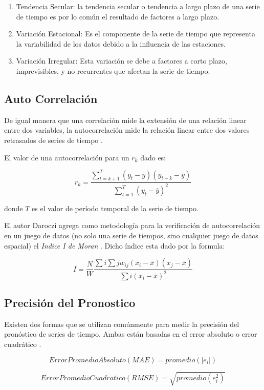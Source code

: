 \begin{enumerate}
	\item Tendencia Secular: la tendencia secular o tendencia a largo plazo de una serie de tiempo es por lo común el resultado de factores a largo plazo. 
	\item Variación Estacional: Es el componente de la serie de tiempo que representa la variabilidad de los datos debido a la influencia de las estaciones.
	\item Variación Irregular: Esta variación se debe a factores a corto plazo, imprevisibles, y no recurrentes que afectan la serie de tiempo. 
\end{enumerate}

\subsection*{Auto Correlación}
De igual manera que una correlación mide la extensión de una relación linear entre dos variables, la autocorrelación mide la relación linear entre dos valores retrasados de series de tiempo \cite{hyndman}.

El valor de una autocorrelación para un \(r_{k}\) dado es:

\[ r_{k} = \frac{\sum_{t = k + 1}^T(y_{t} - \bar{y})(y_{t - k} - \bar{y})}{\sum_{t = 1}^T(y_{t} - \bar{y})^{2}} \]

donde \(T\) es el valor de período temporal de la serie de tiempo. 

El autor Daroczi agrega como metodología para la verificación de autocorrelación en un juego de datos (no solo una serie de tiempos, sino cualquier juego de datos espacial) el \emph{Indice I de Moran} \cite{daroczi}. Dicho índice esta dado por la formula:

\[ I = \frac{N}{W} 
	\frac{\sum{i}\sum{j}w_{ij}(x_{i} - \bar{x})(x_{j} - \bar{x})}{{\sum{i}(x_{i} - \bar{x})^2}} \]

\subsection*{Precisión del Pronostico}
Existen dos formas que se utilizan comúnmente para medir la precisión del pronóstico de series de tiempo. Ambas están basadas en el error absoluto o error cuadrático \cite{hyndman}.

\[Error Promedio Absoluto (MAE) = promedio(|e_{i}|)\]

\[ Error Promedio Cuadratico (RMSE) = \sqrt{promedio(e_{i}^2)}  \]

